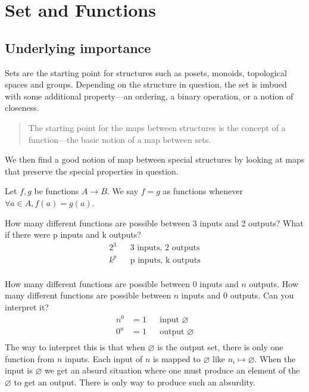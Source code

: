 \section{Set and Functions}
\subsection{Underlying importance}
Sets are the starting point for structures such as posets, monoids, topological
spaces and groups. Depending on the structure in question, the set is imbued
with some additional property---an ordering, a binary operation, or a notion of
closeness.
\begin{quote}
	The starting point for the maps between structures is the concept of a
	function---the basic notion of a map between sets.
\end{quote}
We then find a good notion of map between special structures by
looking at maps that preserve the special properties in question.
\begin{definition}
	Let $f, g$ be functions $A\rightarrow B$. We say $f = g$ as functions whenever
	$\forall a \in A, f(a) = g(a)$.
\end{definition}
\begin{ttta}
	How many different functions are possible between 3 inputs and 2 outputs? What
	if there were p inputs and k outputs?
	\begin{align*}
		2^3 &  & \text{3 inputs, 2 outputs} \\
		k^p &  & \text{p inputs, k outputs} \\
	\end{align*}
\end{ttta}
\begin{ttta}
	How many different functions are possible between $0$ inputs and $n$ outputs.
	How many different functions are possible between $n$ inputs and $0$ outputs.
	Can you interpret it?
	\begin{align*}
		n^0 & =1 &  & \text{input }\varnothing  \\
		0^n & =1 &  & \text{output }\varnothing \\
	\end{align*}
	The way to interpret this is that when $\varnothing$ is the output set, there is
	only one function from $n$ inputs.  Each input of $n$ is mapped to $\varnothing$
	like $n_i \mapsto \varnothing$. When the input is $\varnothing$ we get an absurd
	situation where one must produce an element of the $\varnothing$ to get an output.
	There is only way to produce such an absurdity.
\end{ttta}
